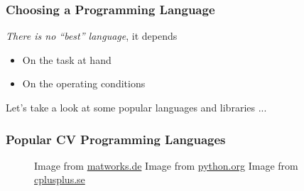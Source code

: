 \documentclass[xetex,professionalfont]{beamer}
\begin{document}
\begin{frame}
\frametitle{Choosing a Programming Language}

\emph{There is no \enquote{best} language}, it depends
\begin{itemize}
	\item On the task at hand %
	\item On the operating conditions %
\end{itemize}

\bigskip
Let's take a look at some popular languages and libraries ...

\end{frame}


\begin{frame}
\frametitle{Popular CV Programming Languages}

\begin{figure}
\centering
{
	{\centering Image from \url{matworks.de}}}\quad
{
	{\centering Image from \url{python.org}}}\quad
{
	{\centering Image from \url{cplusplus.se}}}
\end{figure}

\end{frame}

\end{document}
